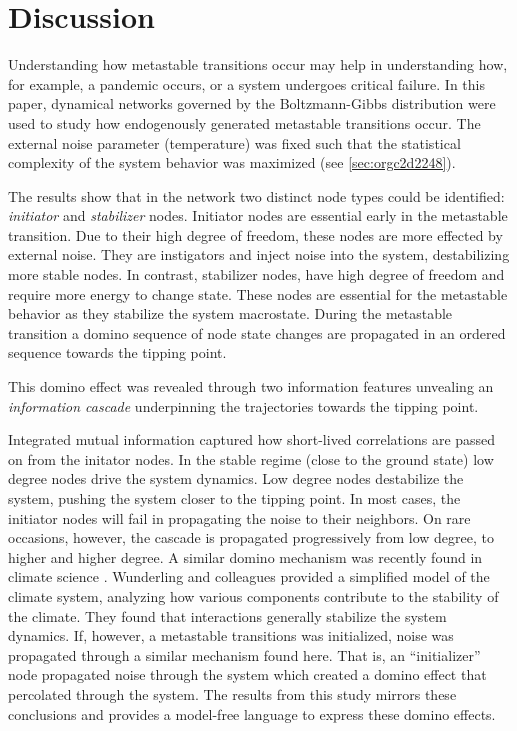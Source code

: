 \documentclass[a4paper, 11pt, twocolumn]{article}
\begin{document}
\section{Discussion}
\label{sec:org389dbab}
Understanding how  metastable transitions occur may  help in
understanding  how, for  example,  a pandemic  occurs, or  a
system undergoes critical failure.  In this paper, dynamical
networks governed  by the Boltzmann-Gibbs  distribution were
used   to  study   how  endogenously   generated  metastable
transitions    occur.   The    external   noise    parameter
(temperature) was fixed such that the statistical complexity
of  the  system behavior  was  maximized  (see \ref{sec:orgc2d2248}).

The results show that in the network two distinct node types
could  be identified:  \emph{initiator}  and \emph{stabilizer}  nodes.
Initiator  nodes  are  essential  early  in  the  metastable
transition. Due to their high degree of freedom, these nodes
are more  effected by  external noise. They  are instigators
and inject noise into  the system, destabilizing more stable
nodes. In  contrast, stabilizer  nodes, have high  degree of
freedom and require more energy to change state. These nodes
are essential for the  metastable behavior as they stabilize
the system  macrostate. During  the metastable  transition a
domino sequence of  node state changes are  propagated in an
ordered sequence towards the tipping point.

This  domino effect  was  revealed  through two  information
features unvealing an \emph{information cascade} underpinning the
trajectories towards the tipping point.

Integrated  mutual  information   captured  how  short-lived
correlations are passed  on from the initator  nodes. In the
stable regime (close  to the ground state)  low degree nodes
drive the system dynamics.  Low degree nodes destabilize the
system, pushing the  system closer to the  tipping point. In
most cases, the initiator nodes will fail in propagating the
noise to  their neighbors.  On rare occasions,  however, the
cascade  is propagated  progressively  from  low degree,  to
higher  and higher  degree. A  similar domino  mechanism was
recently        found        in       climate        science
\cite{Wunderling2020,Wunderling2021}.      Wunderling      and
colleagues  provided  a  simplified  model  of  the  climate
system, analyzing  how various components contribute  to the
stability  of  the  climate. They  found  that  interactions
generally  stabilize the  system  dynamics.  If, however,  a
metastable transitions was initialized, noise was propagated
through  a  similar  mechanism   found  here.  That  is,  an
``initializer'' node propagated noise through the system which
created a domino effect  that percolated through the system.
The results  from this  study mirrors these  conclusions and
provides  a  model-free  language to  express  these  domino
effects.
\end{document}
